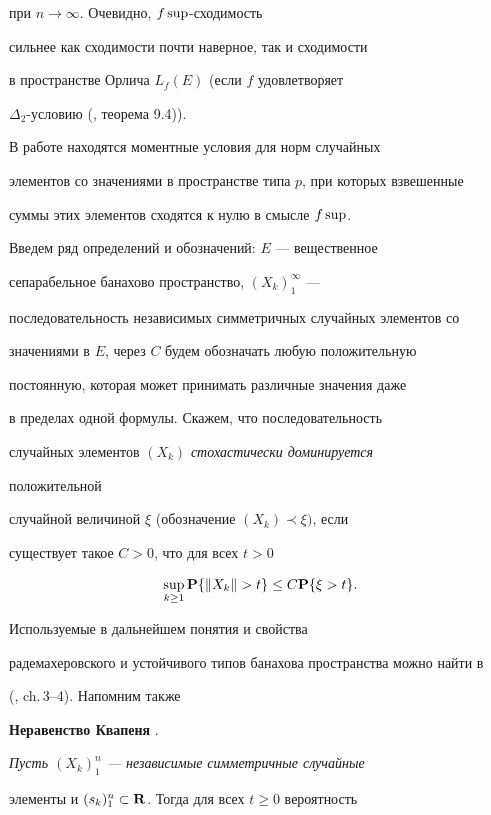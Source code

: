 при $n\to \infty$. Очевидно, $f\sup$-сходимость


сильнее как сходимости почти наверное, так и сходимости


в пространстве Орлича $L_{f} (E)$ (если $f$ удовлетворяет


$\Delta_{2}$-условию (\cite{Kra}, теорема 9.4)).





В работе находятся моментные условия для норм случайных


элементов со значениями в пространстве типа $p$, при которых взвешенные


суммы этих элементов сходятся к нулю в смысле $f\sup$.





Введем ряд определений и обозначений: $E$ --- вещественное


сепарабельное банахово пространство, $(X_{k})^{\infty }_{1}$ ---


последовательность независимых симметричных случайных элементов со


значениями в $E$, через $C$ будем обозначать любую положительную


постоянную, которая может принимать различные значения даже


в пределах одной формулы. Скажем, что последовательность


случайных элементов $(X_{k})$ {\it стохастически доминируется}


положительной


случайной величиной $\xi$ (обозначение $(X_{k} )\prec \xi )$, если


существует такое $C> 0$, что для всех $t>0$


$$


\sup_{k\ge 1} \bold P \{\| X_{k} \| >t\} \le C \bold P \{\xi >t\}.


$$


Используемые в дальнейшем понятия и свойства


радемахеровского и устойчивого типов банахова пространства можно найти в


(\cite{Pis}, ch.\,3--4). Напомним также


\medskip





{\bf Неравенство Квапеня} \cite{Sz}.


{\it Пусть $(X_k)_1^n$ --- независимые симметричные случайные 


элементы и $(s_k)^n_1\subset\bold R$. Тогда для всех $t\ge 0$ вероятность}


